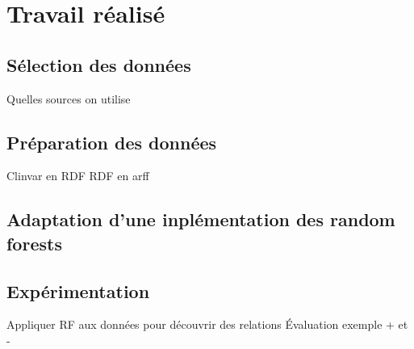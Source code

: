 \chapter{Travail réalisé}

\section{Sélection des données}

Quelles sources on utilise

\section{Préparation des données}

Clinvar en RDF
RDF en arff

\section{Adaptation d'une inplémentation des random forests}

\section{Expérimentation}

Appliquer RF aux données pour découvrir des relations
Évaluation exemple + et -
